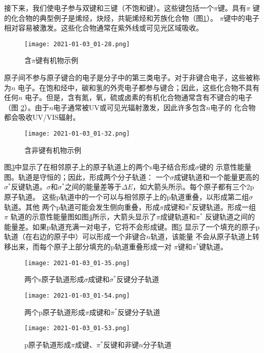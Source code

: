 接下来，我们使电子参与双键和三键（不饱和键）。这些键包括一个$\pi$键。具有$\pi$
键的化合物的典型例子是烯烃，炔烃，共轭烯烃和芳族化合物（图\ref{fig:5.3}）。
$\pi$键中的电子相对容易被激发。这些化合物通常在紫外线或可见光区域吸收。
\begin{figure}[htpb]
    \centering
    \texttt{[image: 2021-01-03\_01-28.png]}
    \caption{含$\pi$键有机物示例}
    \label{fig:5.3}
\end{figure}

原子间不参与原子键合的电子是分子中的第三类电子。对于非键合电子，这些被称为$n$
电子。在饱和烃中，碳和氢的外壳电子都参与键合；因此，这些化合物不具有任何$n$
电子。但是，含有氮，氧，硫或卤素的有机化合物通常含有不键合的电子（图
\ref{fig:5.4}）。由于$n$电子通常被UV或可见光辐射激发，因此许多包含$n$电子的
化合物都会吸收UV/VIS辐射。
\begin{figure}[htpb]
    \centering
    \texttt{[image: 2021-01-03\_01-32.png]}
    \caption{含非键有机物示例}
    \label{fig:5.4}
\end{figure}

图\ref{fig:5.5}中显示了在相邻原子上的原子轨道上的两个s电子结合形成$\sigma$键的
示意性能量图。轨道是守恒的；因此，形成两个分子轨道：
一个$\sigma$成键轨道和一个能量更高的$\sigma^\ast$反键轨道。$\sigma$和$\sigma
^\ast$之间的能量差等于$\Delta E$，如大箭头所示。每个原子都有三个2p原子轨道。
这些p轨道中的一个可以与相邻原子上的p轨道重叠，以形成第二组$\sigma$轨道。其他
两个p轨道可能会发生侧向重叠，形成$\pi$成键和$\pi^\ast$反键轨道。形成一组$\pi$
轨道的示意性能量图如图\ref{fig:5.6}所示，大箭头显示了$\pi$成键轨道和$\pi^\ast$
反键轨道之间的能量差。如果p轨道充满一对电子，它将不会形成键。图\ref{fig:5.7}
显示了一个填充的原子p轨道（在右边的原子中）可以形成一个非键合$n$轨道，该能量
不会从原子轨道上转移出来，而每个原子上部分填充的p轨道重叠形成一对
$\pi$键和$\pi^\ast$键轨道。
\begin{figure}[htpb]
    \centering
    \texttt{[image: 2021-01-03\_01-35.png]}
    \caption{两个s原子轨道形成$\sigma$成键和$\sigma^\ast$反键分子轨道}
    \label{fig:5.5}
\end{figure}
\begin{figure}[htpb]
    \centering
    \texttt{[image: 2021-01-03\_01-54.png]}
    \caption{两个p原子轨道形成$\pi$成键和$\pi^\ast$反键分子轨道}
    \label{fig:5.6}
\end{figure}
\begin{figure}[htpb]
    \centering
    \texttt{[image: 2021-01-03\_01-53.png]}
    \caption{p原子轨道形成$\pi$成键、$\pi^\ast$反键和非键$n$分子轨道}
    \label{fig:5.7}
\end{figure}

